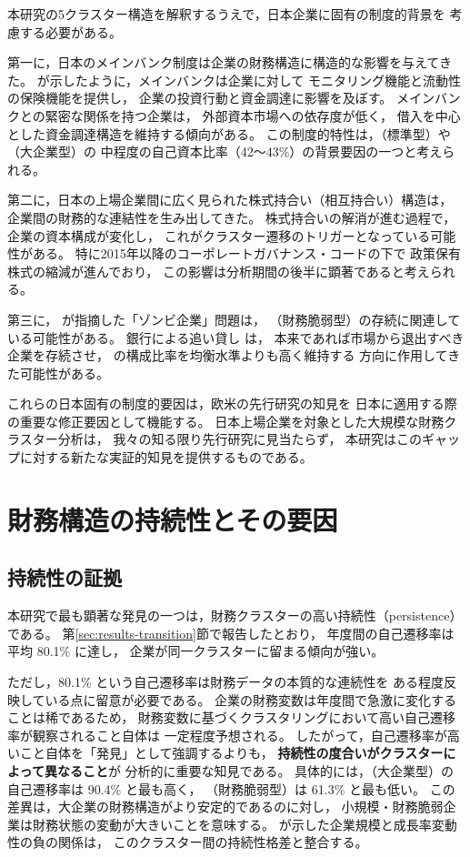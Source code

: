 本研究の5クラスター構造を解釈するうえで，日本企業に固有の制度的背景を
考慮する必要がある。

第一に，日本のメインバンク制度は企業の財務構造に構造的な影響を与えてきた。
 が示したように，メインバンクは企業に対して
モニタリング機能と流動性の保険機能を提供し，
企業の投資行動と資金調達に影響を及ぼす。
メインバンクとの緊密な関係を持つ企業は，
外部資本市場への依存度が低く，
借入を中心とした資金調達構造を維持する傾向がある。
この制度的特性は，（標準型）や （大企業型）の
中程度の自己資本比率（42〜43\%）の背景要因の一つと考えられる。

第二に，日本の上場企業間に広く見られた株式持合い（相互持合い）構造は，
企業間の財務的な連結性を生み出してきた。
株式持合いの解消が進む過程で，企業の資本構成が変化し，
これがクラスター遷移のトリガーとなっている可能性がある。
特に2015年以降のコーポレートガバナンス・コードの下で
政策保有株式の縮減が進んでおり，
この影響は分析期間の後半に顕著であると考えられる。

第三に， が指摘した「ゾンビ企業」問題は，
（財務脆弱型）の存続に関連している可能性がある。
銀行による追い貸し \citep{Peek2005} は，
本来であれば市場から退出すべき企業を存続させ，
 の構成比率を均衡水準よりも高く維持する
方向に作用してきた可能性がある。

これらの日本固有の制度的要因は，欧米の先行研究の知見を
日本に適用する際の重要な修正要因として機能する。
日本上場企業を対象とした大規模な財務クラスター分析は，
我々の知る限り先行研究に見当たらず，
本研究はこのギャップに対する新たな実証的知見を提供するものである。

\section{財務構造の持続性とその要因}
\label{sec:disc-path-dependence}

\subsection{持続性の証拠}

本研究で最も顕著な発見の一つは，財務クラスターの高い持続性（persistence）である。
第\ref{sec:results-transition}節で報告したとおり，
年度間の自己遷移率は平均 80.1\% に達し，
企業が同一クラスターに留まる傾向が強い。

ただし，80.1\% という自己遷移率は財務データの本質的な連続性を
ある程度反映している点に留意が必要である。
企業の財務変数は年度間で急激に変化することは稀であるため，
財務変数に基づくクラスタリングにおいて高い自己遷移率が観察されること自体は
一定程度予想される。
したがって，自己遷移率が高いこと自体を「発見」として強調するよりも，
\textbf{持続性の度合いがクラスターによって異なること}が
分析的に重要な知見である。
具体的には，（大企業型）の自己遷移率は 90.4\% と最も高く，
（財務脆弱型）は 61.3\% と最も低い。
この差異は，大企業の財務構造がより安定的であるのに対し，
小規模・財務脆弱企業は財務状態の変動が大きいことを意味する。
 が示した企業規模と成長率変動性の負の関係は，
このクラスター間の持続性格差と整合する。

